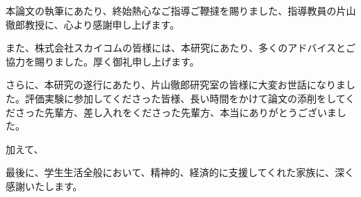 \acknowledgment

本論文の執筆にあたり、終始熱心なご指導ご鞭撻を賜りました、指導教員の片山徹郎教授に、心より感謝申し上げます。

また、株式会社スカイコムの皆様には、本研究にあたり、多くのアドバイスとご協力を賜りました。厚く御礼申し上げます。

さらに、本研究の遂行にあたり、片山徹郎研究室の皆様に大変お世話になりました。評価実験に参加してくださった皆様、長い時間をかけて論文の添削をしてくださった先輩方、差し入れをくださった先輩方、本当にありがとうございました。

加えて、

最後に、学生生活全般において、精神的、経済的に支援してくれた家族に、深く感謝いたします。
